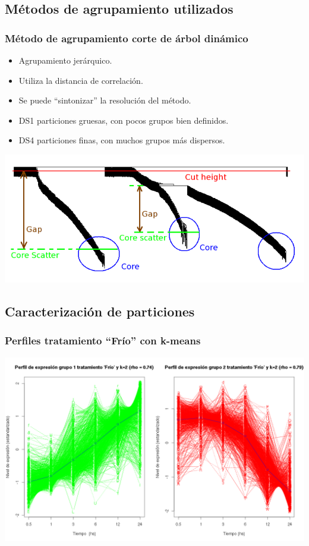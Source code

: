 \documentclass[serif,9pt, t]{beamer}
\begin{document}
\subsection{Métodos de agrupamiento utilizados}
\begin{frame}\frametitle{Método de agrupamiento corte de árbol dinámico} 
\centering
\begin{itemize}
\item Agrupamiento jerárquico.
\item Utiliza la distancia de correlación.
\item Se puede ``sintonizar'' la resolución del método. 
\item DS1 particiones gruesas, con pocos grupos bien definidos.
\item DS4 particiones finas, con muchos grupos más dispersos.
\end{itemize}
\includegraphics[height=0.55\textheight]{cut_tree_dynamic_ejemplo}	
\end{frame}

\subsection{Caracterización de particiones}
\begin{frame}\frametitle{Perfiles tratamiento ``Frío'' con k-means} 
\centering
\includegraphics[width=1\textwidth]{perfiles_k_means}	
\end{frame}
\end{document}

